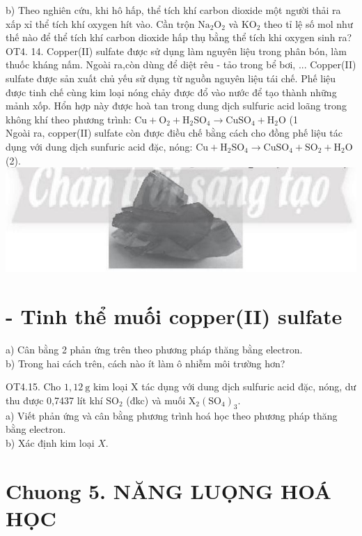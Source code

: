 \documentclass[10pt]{article}
\begin{document}
b) Theo nghiên cứu, khi hô hấp, thể tích khí carbon dioxide một người thải ra xấp xỉ thể tích khí oxygen hít vào. Cần trộn $\mathrm{Na}_{2} \mathrm{O}_{2}$ và $\mathrm{KO}_{2}$ theo tỉ lệ số mol như thế nào để thể tích khí carbon dioxide hấp thụ bằng thể tích khi oxygen sinh ra?\\
OT4. 14. Copper(II) sulfate được sử dụng làm nguyên liệu trong phân bón, làm thuốc kháng nấm. Ngoài ra,còn dùng để diệt rêu - tảo trong bể bơi, ... Copper(II) sulfate được sản xuất chủ yếu sử dụng từ nguồn nguyên liệu tái chế. Phế liệu được tinh chế cùng kim loại nóng chảy được đổ vào nước để tạo thành những mảnh xốp. Hổn hợp này được hoà tan trong dung dịch sulfuric acid loãng trong không khí theo phương trình: $\mathrm{Cu}+\mathrm{O}_{2}+\mathrm{H}_{2} \mathrm{SO}_{4} \rightarrow \mathrm{CuSO}_{4}+\mathrm{H}_{2} \mathrm{O}$ (1\\
Ngoài ra, copper(II) sulfate còn được điều chế bằng cách cho đồng phế liệu tác dụng với dung dịch sunfuric acid đặc, nóng: $\mathrm{Cu}+\mathrm{H}_{2} \mathrm{SO}_{4} \rightarrow \mathrm{CuSO}_{4}+\mathrm{SO}_{2}+\mathrm{H}_{2} \mathrm{O}$ (2).\\
\includegraphics[max width=\textwidth, center]{2025_10_23_883c4b146e2332109fcdg-46(2)}

\section*{- Tinh thể muối copper(II) sulfate}
a) Cân bằng 2 phản ứng trên theo phương pháp thăng bằng electron.\\
b) Trong hai cách trên, cách nào ít làm ô nhiễm môi trường hơn?

OT4.15. Cho $1,12 \mathrm{~g}$ kim loại X tác dụng với dung dịch sulfuric acid đặc, nóng, dư thu được 0,7437 lít khí $\mathrm{SO}_{2}$ (đkc) và muối $\mathrm{X}_{2}\left(\mathrm{SO}_{4}\right)_{3}$.\\
a) Viết phản ứng và cân bằng phương trình hoá học theo phương pháp thăng bằng electron.\\
b) Xác định kim loại $X$.

\section*{Chuong 5. NĂNG LUỌNG HOÁ HỌC}
\end{document}
